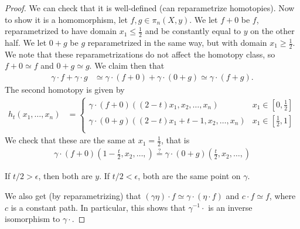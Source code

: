 \documentclass{article}[11pt]
\begin{document}
\begin{proof}
We can check that it is well-defined (can reparametrize homotopies). Now to show it is a homomorphism, let $f,g \in \pi_n(X,y)$. We let $f + 0$ be $f$, reparametrized to have domain $x_1 \leq \frac{1}{2}$ and be constantly equal to $y$ on the other half. We let $0+g$ be $g$ reparametrized in the same way, but with domain $x_1 \geq \frac{1}{2}$. We note that these reparametrizations do not affect the homotopy class, so $f+0\simeq f$ and $0+g\simeq g$. We claim then that
\begin{align*}
	\gamma\cdot f + \gamma \cdot g &\simeq \gamma\cdot (f+0) + \gamma\cdot (0+g) \simeq \gamma\cdot  (f+g).
\end{align*}
The second homotopy is given by
\begin{align*}
	h_t (x_1,\ldots, x_n) &= \begin{cases} \gamma\cdot (f+0) ((2-t)x_1, x_2, \ldots, x_n) & x_1 \in \left[0,\frac{1}{2} \right] \\ \gamma\cdot (0+g)((2-t)x_1 + t-1, x_2, \ldots,x_n) & x_1 \in \left[\frac{1}{2}, 1\right] \\ \end{cases}
\end{align*}
We check that these are the same at $x_1 = \frac{1}{2}$, that is
\begin{align*}
	\gamma\cdot (f+0) (1-\frac{t}{2}, x_2, \ldots, ) \overset{?}{=} \gamma\cdot (0+g) \left( \frac{t}{2}, x_2, \ldots, \right)
\end{align*}

If $t/2 > \epsilon$, then both are $y$. If $t/2 < \epsilon$, both are the same point on $\gamma$.


We also get (by reparametrizing) that $(\gamma \eta)\cdot f \simeq \gamma\cdot (\eta\cdot f)$ and $c\cdot f \simeq f$, where $c$ is a constant path. In particular, this shows that $ \gamma^{-1}\cdot$ is an inverse isomorphism to $ \gamma\cdot $.
\end{proof}
\end{document}
